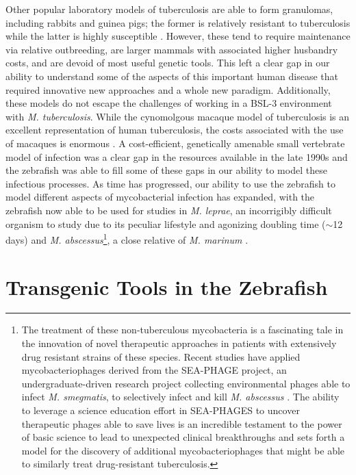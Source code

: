 Other popular laboratory models of tuberculosis are able to form granulomas, including rabbits and guinea pigs; the former is relatively resistant to tuberculosis while the latter is highly susceptible \citep{Clark2014, Dorman2004, Heppleston1949}. However, these tend to require maintenance via relative outbreeding, are larger mammals with associated higher husbandry costs, and are devoid of most useful genetic tools. This left a clear gap in our ability to understand some of the aspects of this important human disease that required innovative new approaches and a whole new paradigm. Additionally, these models do not escape the challenges of working in a BSL\hyp{}3 environment with \textit{M. tuberculosis}. While the cynomolgous macaque model of tuberculosis is an excellent representation of human tuberculosis, the costs associated with the use of macaques is enormous \citep{Pena2015}. A cost\hyp{}efficient, genetically amenable small vertebrate model of infection was a clear gap in the resources available in the late 1990s and the zebrafish was able to fill some of these gaps in our ability to model these infectious processes. As time has progressed, our ability to use the zebrafish to model different aspects of mycobacterial infection has expanded, with the zebrafish now able to be used for studies in \textit{M. leprae}, an incorrigibly difficult organism to study due to its peculiar lifestyle and agonizing doubling time ($\sim$12 days) \citep{Madigan2017} and \textit{M. abscessus}\footnote{The treatment of these non-tuberculous mycobacteria is a fascinating tale in the innovation of novel therapeutic approaches in patients with extensively drug resistant strains of these species. Recent studies have applied mycobacteriophages derived from the SEA-PHAGE project, an undergraduate-driven research project collecting environmental phages able to infect \textit{M. smegmatis}, to selectively infect and kill \textit{M. abscessus} \citep{Jordan2014, Dedrick2022, Dedrick2021, Dedrick2019}. The ability to leverage a science education effort in SEA-PHAGES to uncover therapeutic phages able to save lives is an incredible testament to the power of basic science to lead to unexpected clinical breakthroughs and sets forth a model for the discovery of additional mycobacteriophages that might be able to similarly treat drug-resistant tuberculosis.}, a close relative of \textit{M. marinum} \citep{Halloum2016, Stinear2008, Bryant2016}.

\section{Transgenic Tools in the Zebrafish}\label{transgenics}

